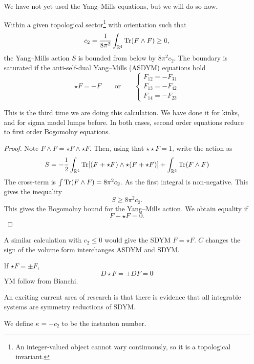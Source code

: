 We have not yet used the Yang--Mills equations, but we will do so now.
\begin{theorem}[]
  Within a given topological sector\footnote{An integer-valued object cannot vary continuously, so it is a topological invariant.} with orientation such that
  \begin{equation}
    c_2 = \frac{1}{8\pi^2} \int_{\mathbb{R}^4} \Tr(F \wedge F) \geq 0,
  \end{equation}
  the Yang--Mills action $S$ is bounded from below by $8 \pi^2 c_2$. The boundary is saturated if the anti-self-dual Yang--Mills (ASDYM) equations hold
  \begin{equation}
    \star F = - F \qquad \text{or} \qquad \left\{
      \begin{gathered}
        F_{12} = -F_{31} \\
        F_{13} = -F_{42} \\
        F_{14} = -F_{23}
      \end{gathered}
      \right.
  \end{equation}
\end{theorem}
\begin{remark}
  This is the third time we are doing this calculation. We have done it for kinks, and for sigma model lumps before.  In both cases, second order equations reduce to first order Bogomolny equations.
\end{remark}
\begin{proof}
  Note $F \wedge F = \star F \wedge \star F$.
  Then, using that $\star \star F = 1$, write the action as
  \begin{equation}
    S = -\frac{1}{2} \int_{\mathbb{R}^4} \Tr[(F + \star F) \wedge \star(F + \star F)] + \int_{\mathbb{R}^4} \Tr(F \wedge F)
  \end{equation}
  The cross-term is $\int \Tr(F \wedge F) = 8 \pi^2 c_2$.
  As the first integral is non-negative. This gives the inequality
  \begin{equation}
    S \geq 8 \pi^2 c_2.
  \end{equation}
  This gives the Bogomolny bound for the Yang--Mills action. We obtain equality if
  \begin{equation}
    F + \star F = 0.
  \end{equation}
\end{proof}

A similar calculation with $c_2 \leq 0$ would give the SDYM $F = \star F$.
$C$ changes the sign of the volume form interchanges ASDYM and SDYM.

If $\star F = \pm F$, 
\begin{equation}
  D \star F = \pm D F = 0
\end{equation}
YM follow from Bianchi.

An exciting current area of research is that there is evidence that all integrable systems are symmetry reductions of SDYM.

We define $ \kappa = - c_2 $ to be the instanton number.
